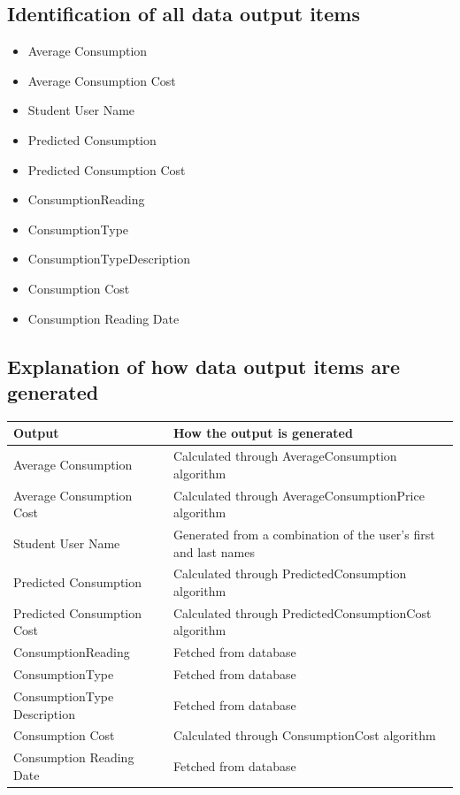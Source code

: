 \subsection{Identification of all data output items}
\begin{itemize}
\item{Average Consumption}
\item{Average Consumption Cost}
\item{Student User Name}
\item{Predicted Consumption}
\item{Predicted Consumption Cost}
\item{ConsumptionReading}
\item{ConsumptionType}
\item{ConsumptionTypeDescription}
\item{Consumption Cost}
\item{Consumption Reading Date}
\end{itemize}

\subsection{Explanation of how data output items are generated}
\begin{center}
\begin{tabular}{|p{5cm}|p{7.5cm}|}
	\hline
	\textbf{Output} & \textbf{How the output is generated} \\ \hline
	Average Consumption &  Calculated through AverageConsumption algorithm \\ \hline
	Average Consumption Cost & Calculated through AverageConsumptionPrice algorithm \\ \hline
	Student User Name & Generated from a combination of the user's first and last names \\ \hline
	Predicted Consumption & Calculated through PredictedConsumption algorithm \\ \hline
	Predicted Consumption Cost & Calculated through PredictedConsumptionCost algorithm \\ \hline
	ConsumptionReading & Fetched from database \\ \hline
	ConsumptionType & Fetched from database \\ \hline
	ConsumptionType Description & Fetched from database \\ \hline
	Consumption Cost & Calculated through ConsumptionCost algorithm \\ \hline
	Consumption Reading Date & Fetched from database \\ \hline
\end{tabular}
\end{center}

